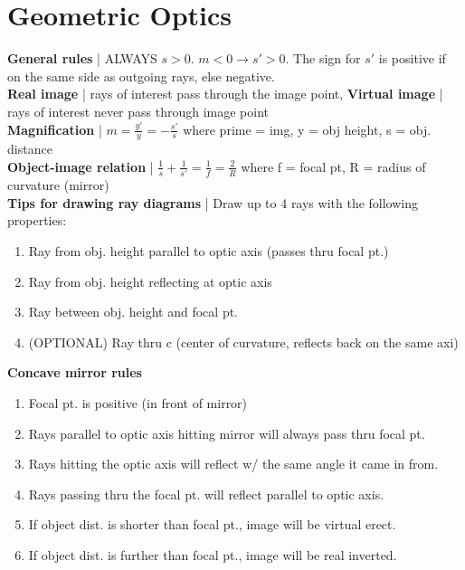 \documentclass{article}
\begin{document}
\section{Geometric Optics}
\vspace{-2mm}
\textbf{General rules} | ALWAYS $s > 0$. $m < 0 \rightarrow s' > 0$. The sign for $s'$ is positive if on the same side as outgoing rays, else negative.\\
\textbf{Real image} | rays of interest pass through the image point, \textbf{Virtual image} | rays of interest never pass through image point \\
\textbf{Magnification} | $m = \frac{y'}{y} = -\frac{s'}{s}$ where prime = img, y = obj height, s = obj. distance \\
\textbf{Object-image relation} | $\frac{1}{s} + \frac{1}{s'} = \frac{1}{f} = \frac{2}{R}$ where f = focal pt, R = radius of curvature (mirror)\\
\textbf{Tips for drawing ray diagrams} | Draw up to 4 rays with the following properties:
\begin{enumerate}
    \vspace{-2mm}
    \item Ray from obj. height parallel to optic axis (passes thru focal pt.)
    \vspace{-3mm}
    \item Ray from obj. height reflecting at optic axis
    \vspace{-3mm}
    \item Ray between obj. height and focal pt.
    \vspace{-3mm}
    \item (OPTIONAL) Ray thru c (center of curvature, reflects back on the same axi)
\end{enumerate}
\vspace{-3mm}
\textbf{Concave mirror rules}
\begin{enumerate}
    \vspace{-2mm}
    \item Focal pt. is positive (in front of mirror)
    \vspace{-3mm}
    \item Rays parallel to optic axis hitting mirror will always pass thru focal pt.
    \vspace{-3mm}
    \item Rays hitting the optic axis will reflect w/ the same angle it came in from.
    \vspace{-3mm}
    \item Rays passing thru the focal pt. will reflect parallel to optic axis.
    \vspace{-3mm}
    \item If object dist. is shorter than focal pt., image will be virtual erect.
    \vspace{-3mm}
    \item If object dist. is further than focal pt., image will be real inverted.
\end{enumerate}
\end{document}
